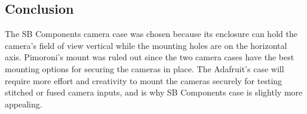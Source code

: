 \documentclass[letterpaper,10pt,serif,draftclsnofoot,onecolumn,compsoc,titlepage]{IEEEtran}
\begin{document}
\subsection{Conclusion}

The SB Components camera case was chosen because its enclosure can hold the camera's 
field of view vertical while the mounting holes are on the horizontal axis. Pimoroni's
mount was ruled out since the two camera cases have the best mounting options for 
securing the cameras in place. The Adafruit's case will require 
more effort and creativity to mount the cameras securely for testing stitched or 
fused camera inputs, and is why SB Components case is slightly more appealing.\\

\nocite{*}
\newpage


\end{document}
